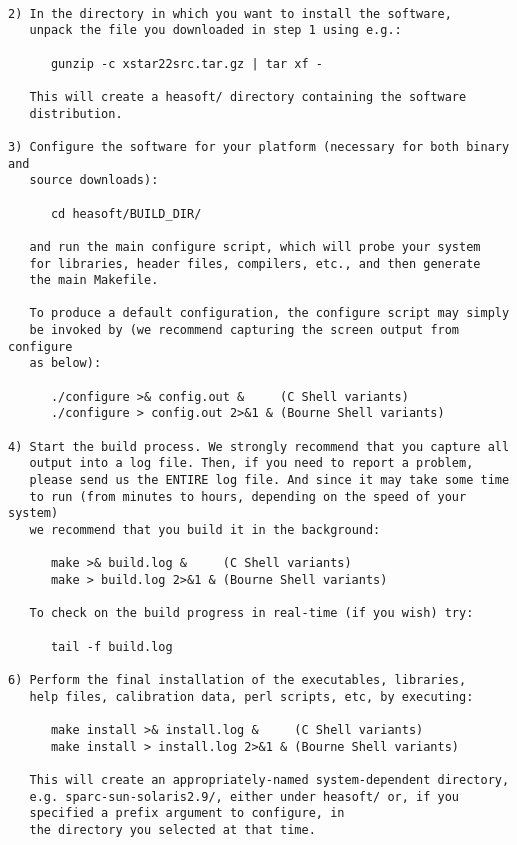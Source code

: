 \begin{verbatim} 

2) In the directory in which you want to install the software,
   unpack the file you downloaded in step 1 using e.g.:

      gunzip -c xstar22src.tar.gz | tar xf -

   This will create a heasoft/ directory containing the software
   distribution.

3) Configure the software for your platform (necessary for both binary and
   source downloads):

      cd heasoft/BUILD_DIR/

   and run the main configure script, which will probe your system
   for libraries, header files, compilers, etc., and then generate
   the main Makefile.

   To produce a default configuration, the configure script may simply
   be invoked by (we recommend capturing the screen output from configure
   as below):

      ./configure >& config.out &     (C Shell variants)
      ./configure > config.out 2>&1 & (Bourne Shell variants)

4) Start the build process. We strongly recommend that you capture all
   output into a log file. Then, if you need to report a problem,
   please send us the ENTIRE log file. And since it may take some time
   to run (from minutes to hours, depending on the speed of your system)
   we recommend that you build it in the background:

      make >& build.log &     (C Shell variants)
      make > build.log 2>&1 & (Bourne Shell variants)

   To check on the build progress in real-time (if you wish) try:

      tail -f build.log

6) Perform the final installation of the executables, libraries,
   help files, calibration data, perl scripts, etc, by executing:

      make install >& install.log &     (C Shell variants)
      make install > install.log 2>&1 & (Bourne Shell variants)

   This will create an appropriately-named system-dependent directory,
   e.g. sparc-sun-solaris2.9/, either under heasoft/ or, if you
   specified a prefix argument to configure, in
   the directory you selected at that time.

\end{verbatim} 




